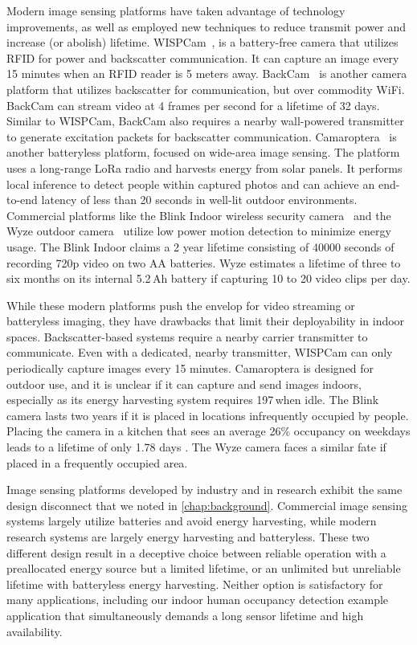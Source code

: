 Modern image sensing platforms have taken advantage of technology improvements, as well as employed new techniques to reduce transmit power and increase (or abolish) lifetime. WISPCam~\cite{naderiparizi2015wispcam}, is a battery-free camera that utilizes RFID for power and backscatter communication. It can capture an image every 15 minutes when an RFID reader is 5 meters away. BackCam~\cite{josephson2019wireless} is  another camera platform that utilizes backscatter for communication, but over commodity WiFi. BackCam can stream video at 4 frames per second for a lifetime of 32 days. Similar to WISPCam, BackCam also requires a nearby wall-powered transmitter to generate excitation packets for backscatter communication. Camaroptera~\cite{nardello2019camaroptera} is another batteryless platform, focused on wide-area image sensing. 
The platform uses a long-range LoRa radio and harvests energy from solar panels. It performs local inference to detect people within captured photos and can achieve an end-to-end latency of less than 20 seconds in well-lit outdoor environments. Commercial platforms like the Blink Indoor wireless security camera~\cite{blinkindoor} and the Wyze outdoor camera~\cite{wyzeoutdoor} utilize low power motion detection to minimize energy usage. The Blink Indoor claims a 2 year lifetime consisting of 40000 seconds of recording 720p video on two AA batteries. Wyze estimates a lifetime of three to six months on its internal 5.2\,Ah battery if capturing 10 to 20 video clips per day.

While these modern platforms push the envelop for video streaming or batteryless imaging, they have drawbacks that limit their deployability in indoor spaces. Backscatter-based systems require a nearby carrier transmitter to communicate. Even with a dedicated, nearby transmitter, WISPCam can only periodically capture images every 15 minutes. Camaroptera is designed for outdoor use, and it is unclear if it can capture and send images indoors, especially as its energy harvesting system requires 197\,\uW when idle. 
The Blink camera lasts two years if it is placed in locations infrequently occupied by people. Placing the camera in a kitchen that sees an average 26\% occupancy on weekdays leads to a lifetime of only 1.78 days \cite{josephson2019wireless}. The Wyze camera faces a similar fate if placed in a frequently occupied area.

Image sensing platforms developed by industry and in research exhibit the same design disconnect that we noted in \cref{chap:background}. Commercial image sensing systems largely utilize batteries and avoid energy harvesting, while modern research systems are largely energy harvesting and batteryless.
These two different design result in a deceptive choice between reliable operation with a preallocated energy source but a limited lifetime, or an unlimited but unreliable lifetime with batteryless energy harvesting.
Neither option is satisfactory for many applications, including our indoor human occupancy detection example application that simultaneously demands a long sensor lifetime and high availability.

